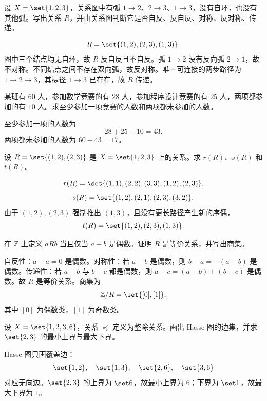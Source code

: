 \begin{exercise}[level=standard]
设 $X=\set{1,2,3}$，关系图中有弧 $1\to2$、$2\to3$、$1\to3$，没有自环，也没有其他弧。写出关系 $R$，并由关系图判断它是否自反、反自反、对称、反对称、传递。
\begin{solution}
\[
  R=\set{(1,2),(2,3),(1,3)}.
  \]
  图中三个结点均无自环，故 $R$ 反自反且不自反。弧 $1\to2$ 没有反向弧 $2\to1$，故不对称。不同结点之间不存在双向弧，故反对称。唯一可连接的两步路径为 $1\to2\to3$，其捷径 $1\to3$ 已存在，故 $R$ 传递。
\end{solution}
\end{exercise}

\begin{exercise}[level=standard]
某班有 $60$ 人，参加数学竞赛的有 $28$ 人，参加程序设计竞赛的有 $25$ 人，两项都参加的有 $10$ 人。求至少参加一项竞赛的人数和两项都未参加的人数。
\begin{solution}
至少参加一项的人数为
  \[
  28+25-10=43.
  \]
  两项都未参加的人数为 $60-43=17$。
\end{solution}
\end{exercise}

\begin{exercise}[level=standard]
设 $R=\set{(1,2),(2,3)}$ 是 $X=\set{1,2,3}$ 上的关系。求 $r(R)$、$s(R)$ 和 $t(R)$。
\begin{solution}
\[
  r(R)=\set{(1,1),(2,2),(3,3),(1,2),(2,3)}.
  \]
  \[
  s(R)=\set{(1,2),(2,1),(2,3),(3,2)}.
  \]
  由于 $(1,2),(2,3)$ 强制推出 $(1,3)$，且没有更长路径产生新的序偶，
  \[
  t(R)=\set{(1,2),(2,3),(1,3)}.
  \]
\end{solution}
\end{exercise}

\begin{exercise}[level=standard]
在 $\mathbb Z$ 上定义 $aRb$ 当且仅当 $a-b$ 是偶数。证明 $R$ 是等价关系，并写出商集。
\begin{solution}
自反性：$a-a=0$ 是偶数。对称性：若 $a-b$ 是偶数，则 $b-a=-(a-b)$ 是偶数。传递性：若 $a-b$ 与 $b-c$ 都是偶数，则 $a-c=(a-b)+(b-c)$ 是偶数。故 $R$ 是等价关系。商集为
  \[
  \mathbb Z/R=\set{[0],[1]},
  \]
  其中 $[0]$ 为偶数类，$[1]$ 为奇数类。
\end{solution}
\end{exercise}

\begin{exercise}[level=advanced]
设 $X=\set{1,2,3,6}$，关系 $\preceq$ 定义为整除关系。画出 Hasse 图的边集，并求 $\set{2,3}$ 的最小上界与最大下界。
\begin{solution}
Hasse 图只画覆盖边：
  \[
  \set{1,2},\quad \set{1,3},\quad \set{2,6},\quad \set{3,6}
  \]
  对应无向边。$\set{2,3}$ 的上界为 $\set6$，故最小上界为 $6$；下界为 $\set1$，故最大下界为 $1$。
\end{solution}
\end{exercise}

